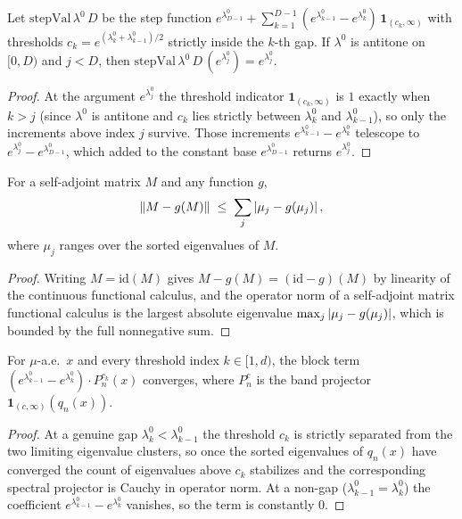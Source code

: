 \begin{lemma}\label{stepVal_exp_lam}
  \leanok
  Let \(\mathrm{stepVal}\,\lambda^0\,D\) be the step function
  \(e^{\lambda^0_{D-1}} + \sum_{k=1}^{D-1}(e^{\lambda^0_{k-1}}-e^{\lambda^0_k})\,
  \mathbf 1_{(c_k,\infty)}\) with thresholds \(c_k = e^{(\lambda^0_k+\lambda^0_{k-1})/2}\) strictly
  inside the \(k\)-th gap. If \(\lambda^0\) is antitone on \([0,D)\) and \(j<D\), then
  \(\mathrm{stepVal}\,\lambda^0\,D\,(e^{\lambda^0_j}) = e^{\lambda^0_j}\).
\end{lemma}
\begin{proof}\leanok
  At the argument \(e^{\lambda^0_j}\) the threshold indicator \(\mathbf 1_{(c_k,\infty)}\) is
  \(1\) exactly when \(k>j\) (since \(\lambda^0\) is antitone and \(c_k\) lies strictly between
  \(\lambda^0_k\) and \(\lambda^0_{k-1}\)), so only the increments above index \(j\) survive.
  Those increments \(e^{\lambda^0_{k-1}}-e^{\lambda^0_k}\) telescope to
  \(e^{\lambda^0_j}-e^{\lambda^0_{D-1}}\), which added to the constant base \(e^{\lambda^0_{D-1}}\)
  returns \(e^{\lambda^0_j}\).
\end{proof}

\begin{lemma}\label{norm_sub_cfc_le_sum_eigenvalue_dev}
  \leanok
  For a self-adjoint matrix \(M\) and any function \(g\),
  \[
    \left\lVert M - g(M) \right\rVert \;\le\; \sum_j \left\lvert \mu_j - g(\mu_j) \right\rvert,
  \]
  where \(\mu_j\) ranges over the sorted eigenvalues of \(M\).
\end{lemma}
\begin{proof}\leanok
  Writing \(M = \mathrm{id}(M)\) gives \(M - g(M) = (\mathrm{id}-g)(M)\) by linearity of the
  continuous functional calculus, and the operator norm of a self-adjoint matrix functional
  calculus is the largest absolute eigenvalue \(\max_j\left\lvert \mu_j-g(\mu_j) \right\rvert\), which is bounded by
  the full nonnegative sum.
\end{proof}

\begin{lemma}\label{ae_forall_tendsto_block_term}
  \leanok
  For \(\mu\)-a.e.\ \(x\) and every threshold index \(k\in[1,d)\), the block term
  \((e^{\lambda^0_{k-1}}-e^{\lambda^0_k})\cdot P^{c_k}_n(x)\) converges, where \(P^{c}_n\) is the
  band projector \(\mathbf 1_{(c,\infty)}(q_n(x))\).
\end{lemma}
\begin{proof}\leanok
  At a genuine gap \(\lambda^0_k < \lambda^0_{k-1}\) the threshold \(c_k\) is strictly separated
  from the two limiting eigenvalue clusters, so once the sorted eigenvalues of \(q_n(x)\) have
  converged the count of eigenvalues above \(c_k\) stabilizes and the corresponding spectral
  projector is Cauchy in operator norm. At a non-gap (\(\lambda^0_{k-1}=\lambda^0_k\)) the
  coefficient \(e^{\lambda^0_{k-1}}-e^{\lambda^0_k}\) vanishes, so the term is constantly \(0\).
\end{proof}

